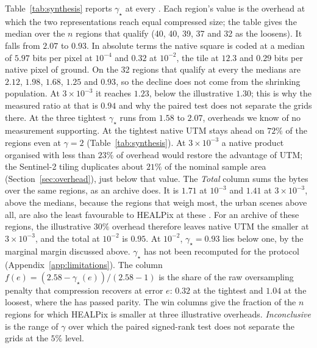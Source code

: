 Table~\ref{tab:synthesis} reports $\gamma_\star$ at every . Each
region's value is the overhead at which the two representations reach
equal compressed size; the table gives the median over the $n$ regions
that qualify (40, 40, 39, 37 and 32 as the  loosens). It
falls from $2.07$ to $0.93$. In absolute terms the native square is
coded at a median of $5.97$ bits per pixel at $10^{-4}$ and $0.32$ at
$10^{-2}$, the tile at $12.3$ and $0.29$ bits per native pixel of
ground. On the 32 regions that qualify at every
 the medians are $2.12$, $1.98$, $1.68$, $1.25$ and $0.93$,
so the decline does not come from the shrinking population. At $3\times10^{-3}$ it reaches $1.23$, below the
illustrative $1.30$; this is why the measured ratio at that  is
$0.94$ and why the paired test does not separate the grids there. At the
three tightest  $\gamma_\star$ runs from $1.58$ to $2.07$,
overheads we know of no measurement supporting. At the tightest 
native UTM stays ahead on $72\%$ of the regions even at $\gamma=2$
(Table~\ref{tab:synthesis}). At $3\times10^{-3}$ a native product organised with less
than $23\%$ of overhead would restore the advantage of UTM; the
Sentinel-2 tiling duplicates about $21\%$ of the nominal sample area
(Section~\ref{sec:overhead}), just below that value. The \emph{Total} column sums the bytes over the
same regions, as an archive does. It is $1.71$ at $10^{-3}$ and $1.41$
at $3\times10^{-3}$, above the medians, because the regions that weigh
most, the urban scenes above all, are also the least favourable to
HEALPix at these . For an archive of these regions, the
illustrative $30\%$ overhead therefore leaves native UTM the smaller at
$3\times10^{-3}$, and the total at $10^{-2}$ is $0.95$. At $10^{-2}$,
$\gamma_\star=0.93$ lies below one, by the marginal margin discussed
above. $\gamma_\star$ has not
been recomputed for the  protocol
(Appendix~\ref{app:limitations}). The column
$f(e)=(2.58-\gamma_\star(e))/(2.58-1)$ is the share of the raw
oversampling penalty that compression recovers at error $e$: $0.32$ at
the tightest  and $1.04$ at the loosest, where the  has
passed parity. The win columns give the fraction of the $n$ regions for
which HEALPix is smaller at three illustrative overheads.
\emph{Inconclusive} is the range of $\gamma$ over which the paired
signed-rank test does not separate the grids at the $5\%$ level.


